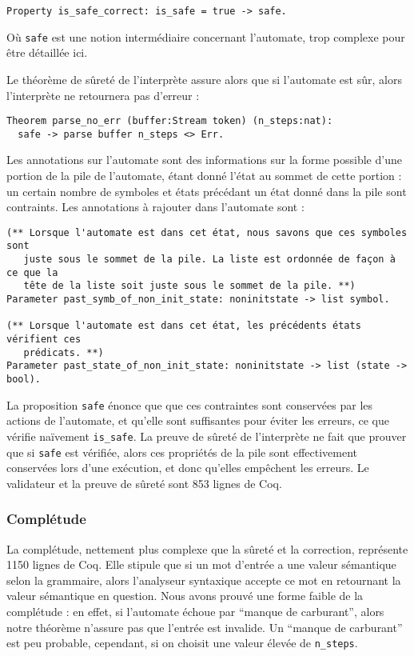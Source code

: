 \documentclass[a4paper,11pt]{article}
\begin{document}
\begin{verbatim}
Property is_safe_correct: is_safe = true -> safe.
\end{verbatim}

Où \verb+safe+ est une notion intermédiaire concernant l'automate,
trop complexe pour être détaillée ici.

Le théorème de sûreté de l'interprète assure alors que si l'automate
est sûr, alors l'interprète ne retournera pas d'erreur :

\begin{verbatim}
Theorem parse_no_err (buffer:Stream token) (n_steps:nat):
  safe -> parse buffer n_steps <> Err.
\end{verbatim}

Les annotations sur l'automate sont des informations sur la forme
possible d'une portion de la pile de l'automate, étant donné l'état au
sommet de cette portion : un certain nombre de symboles et états
précédant un état donné dans la pile sont contraints. Les annotations
à rajouter dans l'automate sont :

\begin{verbatim}
(** Lorsque l'automate est dans cet état, nous savons que ces symboles sont
   juste sous le sommet de la pile. La liste est ordonnée de façon à ce que la
   tête de la liste soit juste sous le sommet de la pile. **)
Parameter past_symb_of_non_init_state: noninitstate -> list symbol.

(** Lorsque l'automate est dans cet état, les précédents états vérifient ces
   prédicats. **)
Parameter past_state_of_non_init_state: noninitstate -> list (state -> bool).
\end{verbatim}

La proposition \verb+safe+ énonce que que ces contraintes sont
conservées par les actions de l'automate, et qu'elle sont suffisantes
pour éviter les erreurs, ce que vérifie naïvement \verb+is_safe+. La
preuve de sûreté de l'interprète ne fait que prouver que si
\verb+safe+ est vérifiée, alors ces propriétés de la pile sont
effectivement conservées lors d'une exécution, et donc qu'elles
empêchent les erreurs. Le validateur et la preuve de sûreté sont 853
lignes de Coq.

\subsubsection{Complétude}

La complétude, nettement plus complexe que la sûreté et la
correction, représente 1150 lignes de Coq. Elle stipule que si un
mot d'entrée a une valeur sémantique selon la grammaire, alors
l'analyseur syntaxique accepte ce mot en retournant la valeur
sémantique en question. Nous avons prouvé une forme faible de la
complétude : en effet, si l'automate échoue par ``manque de
carburant'', alors notre théorème n'assure pas que l'entrée est
invalide. Un ``manque de carburant'' est peu probable, cependant, si
on choisit une valeur élevée de \verb+n_steps+.
\end{document}
